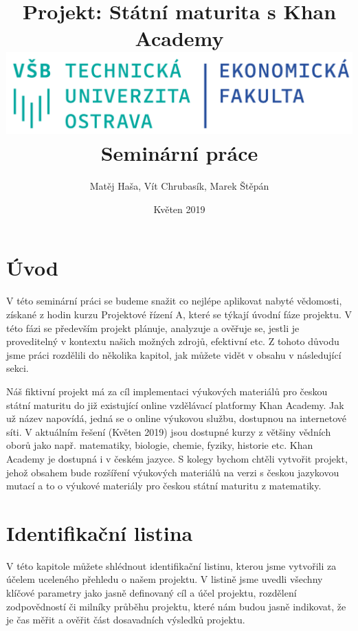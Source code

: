 \documentclass[12pt, a4paper]{report}
\author{Matěj Haša, Vít Chrubasík, Marek Štěpán}
\date{Květen 2019}
\title{Projekt: Státní maturita s Khan Academy\\\medskip
\large \includegraphics[width=\linewidth]{./images/skola_logo.png} Seminární práce}
\begin{document}
\maketitle
\tableofcontents
\thispagestyle{empty}



\chapter{Úvod}
\label{sec:org3f72f3c}
V této seminární práci se budeme snažit co nejlépe aplikovat nabyté vědomosti, získané z hodin kurzu Projektové řízení A, které se týkají úvodní fáze projektu. V této fázi se především projekt plánuje, analyzuje a ověřuje se, jestli je proveditelný v kontextu našich možných zdrojů, efektivní etc. Z tohoto důvodu jsme práci rozdělili do několika kapitol, jak můžete vidět v obsahu v následující sekci. 

Náš fiktivní projekt má za cíl implementaci výukových materiálů pro českou státní maturitu do již existující online vzdělávací platformy Khan Academy. Jak už název napovídá, jedná se o online výukovou službu, dostupnou na internetové síti. V aktuálním řešení (Květen 2019) jsou dostupné kurzy z většiny vědních oborů jako např. matematiky, biologie, chemie, fyziky, historie etc. Khan Academy je dostupná i v českém jazyce. S kolegy bychom chtěli vytvořit projekt, jehož obsahem bude rozšíření výukových materiálů na verzi s českou jazykovou mutací a to o výukové materiály pro českou státní maturitu z matematiky.
\chapter{Identifikační listina}
\label{sec:org8360286}
V této kapitole můžete shlédnout identifikační listinu, kterou jsme vytvořili za účelem uceleného přehledu o našem projektu. V listině jsme uvedli všechny klíčové parametry jako jasně definovaný cíl a účel projektu, rozdělení zodpovědností či milníky průběhu projektu, které nám budou jasně indikovat, že je čas měřit a ověřit část dosavadních výsledků projektu.
\end{document}
